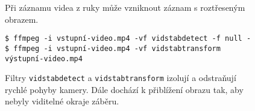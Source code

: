 \begingroup
\begin{subfigure}{\linewidth}

\vspace{-4pt}

\caption{Při záznamu videa z ruky může vzniknout záznam s roztřeseným obrazem.}
\end{subfigure}
\par\vspace{7.5pt}%
%
\begin{subfigure}{\linewidth}
\begingroup
\small
\begin{verbatim}
$ ffmpeg -i vstupní-video.mp4 -vf vidstabdetect -f null -
$ ffmpeg -i vstupní-video.mp4 -vf vidstabtransform výstupní-video.mp4
\end{verbatim}
\endgroup

\caption{Filtry \texttt{vidstabdetect} a \texttt{vidstabtransform} izolují a odstraňují rychlé pohyby kamery. Dále dochází k přiblížení obrazu tak, aby nebyly viditelné okraje záběru.}
\end{subfigure}
\endgroup